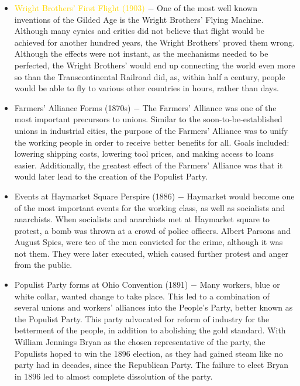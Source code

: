 \documentclass[12pt]{article}
\begin{document}
\begin{itemize}
  \item \textcolor{gold}{Wright Brothers' First Flight (1903)} $-$ One of the most well known inventions of the Gilded Age is the Wright Brothers' Flying Machine. Although many cynics and critics did not believe that flight would be achieved for another hundred years, the Wright Brothers' proved them wrong. Although the effects were not instant, as the mechanisms needed to be perfected, the Wright Brothers' would end up connecting the world even more so than the Transcontinental Railroad did, as, within half a century, people would be able to fly to various other countries in hours, rather than days.

  \item \textcolor{darkmidnightblue}{Farmers' Alliance Forms (1870s)} $-$ The Farmers' Alliance was one of the most important precursors to unions. Similar to the soon-to-be-established unions in industrial cities, the purpose of the Farmers' Alliance was to unify the working people in order to receive better benefits for all. Goals included: lowering shipping costs, lowering tool prices, and making access to loans easier. Additionally, the greatest effect of the Farmers' Alliance was that it would later lead to the creation of the Populist Party.

  \item \textcolor{darkmidnightblue}{Events at Haymarket Square Perspire (1886)} $-$ Haymarket would become one of the most important events for the working class, as well as socialists and anarchists. When socialists and anarchists met at Haymarket square to protest, a bomb was thrown at a crowd of police officers. Albert Parsons and August Spies, were teo of the men convicted for the crime, although it was not them. They were later executed, which caused further protest and anger from the public.

  \item \textcolor{darkmidnightblue}{Populist Party forms at Ohio Convention (1891)} $-$ Many workers, blue or white collar, wanted change to take place. This led to a combination of several unions and workers' alliances into the People's Party, better known as the Populist Party. This party advocated for reform of industry for the betterment of the people, in addition to abolishing the gold standard. With William Jennings Bryan as the chosen representative of the party, the Populists hoped to win the 1896 election, as they had gained steam like no party had in decades, since the Republican Party. The failure to elect Bryan in 1896 led to almost complete dissolution of the party.


\end{itemize}
\end{document}
